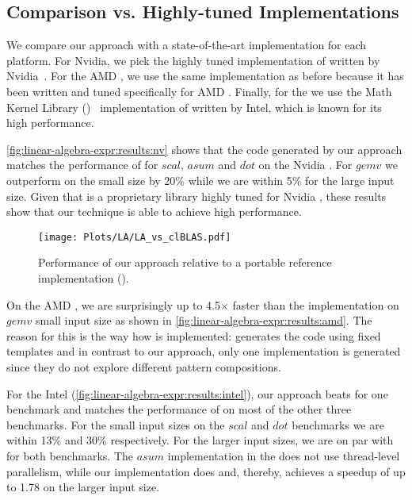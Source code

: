 \subsection{Comparison vs. Highly-tuned Implementations}

We compare our approach with a state-of-the-art implementation for each platform.
For Nvidia, we pick the highly tuned \CUBLAS implementation of \BLAS written by Nvidia~\cite{cuBLAS}.
For the AMD \GPU, we use the same \clBLAS implementation as before because it has been written and tuned specifically for AMD \GPUs.
Finally, for the \CPU we use the Math Kernel Library (\MKL)~\cite{MKL} implementation of \BLAS written by Intel, which is known for its high performance.

\autoref{fig:linear-algebra-expr:results:nv} shows that the code generated by our approach matches the performance of \CUBLAS for $scal$, $asum$ and $dot$ on the Nvidia \GPU.
For $gemv$ we outperform \CUBLAS on the small size by 20\% while we are within 5\% for the large input size.
Given that \CUBLAS is a proprietary library highly tuned for Nvidia \GPUs, these results show that our technique is able to achieve high performance.

\begin{figure}[t]
  \centering
  \texttt{[image: Plots/LA/LA\_vs\_clBLAS.pdf]}
  \caption[Performance of our approach relative to a portable \OpenCL reference implementation]%
          {Performance of our approach relative to a portable \OpenCL reference implementation (\clBLAS).}
  \label{fig:linear-algebra-expr:clblas}
\end{figure}

On the AMD \GPU, we are surprisingly up to 4.5$\times$ faster than the \clBLAS implementation on $gemv$ small input size as shown in \autoref{fig:linear-algebra-expr:results:amd}.
The reason for this is the way how \clBLAS is implemented:
\clBLAS generates the \OpenCL code using fixed templates and in contrast to our approach, only one implementation is generated since they do not explore different pattern compositions.

For the Intel \CPU (\autoref{fig:linear-algebra-expr:results:intel}), our approach beats \MKL for one benchmark and matches the performance of \MKL on most of the other three benchmarks.
For the small input sizes on the $scal$ and $dot$ benchmarks we are within 13\% and 30\% respectively.
For the larger input sizes, we are on par with \MKL for both benchmarks.
The $asum$ implementation in the \MKL does not use thread-level parallelism, while our implementation does and, thereby, achieves a speedup of up to 1.78 on the larger input size.


